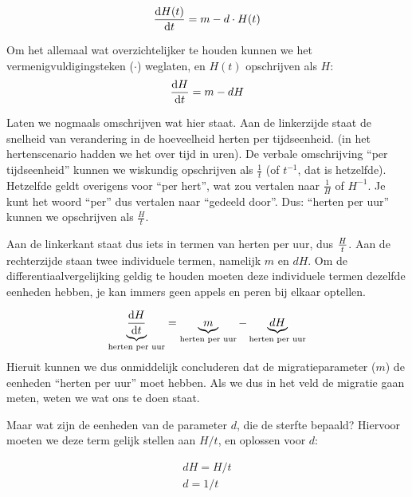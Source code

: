 \documentclass[
  a4paper,
]{scrbook}
\theoremstyle{definition}
\theoremstyle{remark}
\begin{document}
\begin{align}
\mathchoice{\frac{\mathrm{d}H(t)}
{\mathrm{d}t}}{\mathrm{d}H(t)/\mathrm{d}t}
{\mathrm{d}H(t)/\mathrm{d}t}
{\mathrm{d}H(t)/\mathrm{d}t} = m - d \cdot H(t)
\end{align}

Om het allemaal wat overzichtelijker te houden kunnen we het
vermenigvuldigingsteken (\(\cdot\)) weglaten, en \(H(t)\) opschrijven
als \(H\): \begin{align}
\mathchoice{\frac{\mathrm{d}H}
{\mathrm{d}t}}{\mathrm{d}H/\mathrm{d}t}
{\mathrm{d}H/\mathrm{d}t}
{\mathrm{d}H/\mathrm{d}t} = m - dH
\end{align}

Laten we nogmaals omschrijven wat hier staat. Aan de linkerzijde staat
de snelheid van verandering in de hoeveelheid herten per tijdseenheid.
(in het hertenscenario hadden we het over tijd in uren). De verbale
omschrijving ``per tijdseenheid'' kunnen we wiskundig opschrijven als
\(\frac{1}{t}\) (of \(t^{-1}\), dat is hetzelfde). Hetzelfde geldt
overigens voor ``per hert'', wat zou vertalen naar \(\frac{1}{H}\) of
\(H^{-1}\). Je kunt het woord ``per'' dus vertalen naar ``gedeeld
door''. Dus: ``herten per uur'' kunnen we opschrijven als
\(\frac{H}{t}\).

Aan de linkerkant staat dus iets in termen van herten per uur, dus
\(H \over t\). Aan de rechterzijde staan twee individuele termen,
namelijk \(m\) en \(dH\). Om de differentiaalvergelijking geldig te
houden moeten deze individuele termen dezelfde eenheden hebben, je kan
immers geen appels en peren bij elkaar optellen.

\begin{align}
\underbrace{\mathchoice{\frac{\mathrm{d}H}
{\mathrm{d}t}}{\mathrm{d}H/\mathrm{d}t}
{\mathrm{d}H/\mathrm{d}t}
{\mathrm{d}H/\mathrm{d}t}}_{\text{herten per uur}} = \underbrace{m}_{\text{herten per uur}} - \underbrace{dH}_{\text{herten per uur}}
\end{align} Hieruit kunnen we dus onmiddelijk concluderen dat de
migratieparameter (\(m\)) de eenheden ``herten per uur'' moet hebben.
Als we dus in het veld de migratie gaan meten, weten we wat ons te doen
staat.

Maar wat zijn de eenheden van de parameter \(d\), die de sterfte
bepaald? Hiervoor moeten we deze term gelijk stellen aan \(H/t\), en
oplossen voor \(d\):

\begin{align*}
    dH = H/t \\
    d = 1/t
\end{align*}
\end{document}
